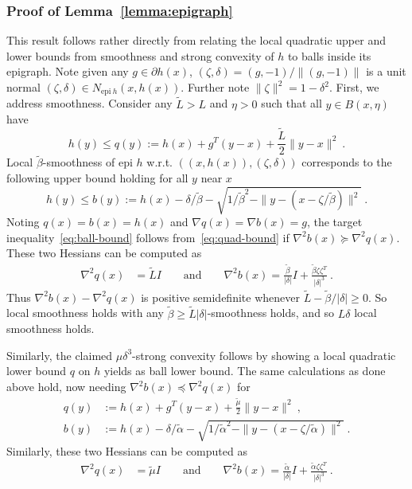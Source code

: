 \documentclass[sn-mathphys,Numbered]{sn-jnl}%
\newcommand{\epi}{\text{epi }}
\begin{document}
\begin{appendices}
{\subsubsection{Proof of Lemma~\ref{lemma:epigraph}}    \label{pf: epigraph}
This result follows rather directly from relating the local quadratic upper and lower bounds from smoothness and strong convexity of $h$ to balls inside its epigraph. Note given any $g\in\partial h(x)$, $(\zeta,\delta) = (g,-1)/\|(g,-1)\|$ is a unit normal $(\zeta,\delta)\in N_{\mathrm{epi\ }h}(x,h(x))$. Further note $\|\zeta\|^2=1-\delta^2$. First, we address smoothness. Consider any $\tilde L > L$ and $\eta>0$ such that all $y\in B(x,\eta)$ have
\begin{equation}\label{eq:quad-bound}
     h(y) \leq q(y) := h(x) + g^T(y-x) + \frac{\tilde L}{2}\|y-x\|^2 \ .
\end{equation}
Local $\tilde \beta$-smoothness of $\epi h$ w.r.t. $((x,h(x)),(\zeta,\delta))$ corresponds to the following upper bound holding for all $y$ near $x$
\begin{equation}\label{eq:ball-bound}
    h(y) \leq b(y) := h(x) - \delta/\tilde \beta - \sqrt{1/\tilde \beta^2 - \|y-(x-\zeta/\tilde \beta)\|^2}\ .
\end{equation}
Noting $q(x) = b(x) = h(x)$ and $\nabla q(x) = \nabla b(x) = g$, the target inequality~\eqref{eq:ball-bound} follows from~\eqref{eq:quad-bound} if $\nabla^2 b(x)\succeq \nabla^2 q(x)$. These two Hessians can be computed as
\begin{align*}
    \nabla^2 q(x) &= \tilde L I \qquad \text{and} \qquad
    \nabla^2 b(x) = \frac{\tilde \beta}{|\delta|}I+\frac{\tilde \beta\zeta\zeta^T}{|\delta|^{3}}\ .
\end{align*}
Thus $\nabla^2 b(x)-\nabla^2 q(x)$ is positive semidefinite whenever $\tilde L - \tilde \beta/|\delta| \geq 0 $.
So local smoothness holds with any $\tilde \beta\geq \tilde L|\delta|$-smoothness holds, and so $L\delta$ local smoothness holds.

Similarly, the claimed $\mu\delta^3$-strong convexity follows by showing a local quadratic lower bound $q$ on $h$ yields as ball lower bound. The same calculations as done above hold, now needing $\nabla^2 b(x)\preceq \nabla^2 q(x)$ for
\begin{align*}
     q(y) &:= h(x) + g^T(y-x) + \frac{\tilde \mu}{2}\|y-x\|^2 \ , \\
     b(y) &:= h(x) - \delta/\tilde \alpha - \sqrt{1/\tilde \alpha^2 - \|y-(x-\zeta/\tilde \alpha)\|^2}\ .
\end{align*}
Similarly, these two Hessians can be computed as
\begin{align*}
    \nabla^2 q(x) &= \tilde \mu I \qquad \text{and} \qquad
    \nabla^2 b(x) = \frac{\tilde \alpha}{|\delta|}I+\frac{\tilde \alpha\zeta\zeta^T}{|\delta|^{3}}\ .
\end{align*}

}
\end{appendices}
\end{document}
